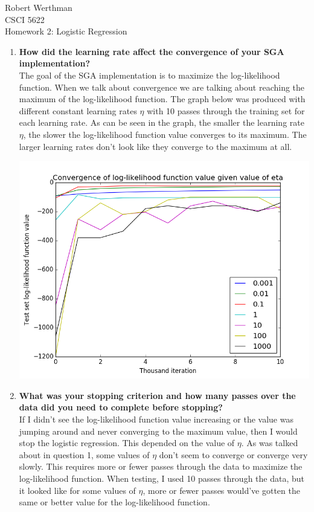 \documentclass[8pt]{article}
\begin{document}
\noindent
Robert Werthman\\
CSCI 5622\\
Homework 2: Logistic Regression\\

\begin{enumerate}
\item \textbf{How did the learning rate affect the convergence of your SGA implementation?}\\
The goal of the SGA implementation is to maximize the log-likelihood function.  When we talk about convergence we are talking about reaching the maximum of the log-likelihood function.  The graph below was produced with different constant learning rates $\eta$ with 10 passes through the training set for each learning rate.  As can be seen in the graph, the smaller the learning rate $\eta$, the slower the log-likelihood function value converges to its maximum.  The larger learning rates don't look like they converge to the maximum at all.\\
\begin{center}
\includegraphics[scale=.4]{q1.png}
\end{center}
\item \textbf{What was your stopping criterion and how many passes over the data did you need to complete before stopping?}\\
If I didn't see the log-likelihood function value increasing or the value was jumping around and never converging to the maximum value, then I would stop the logistic regression.  This depended on the value of $\eta$.  As was talked about in question 1, some values of $\eta$ don't seem to converge or converge very slowly.  This requires more or fewer passes through the data to maximize the log-likelihood function.  When testing, I used 10 passes through the data, but it looked like for some values of $\eta$, more or fewer passes would've gotten the same or better value for the log-likelihood function.  


\end{enumerate}
\end{document}
